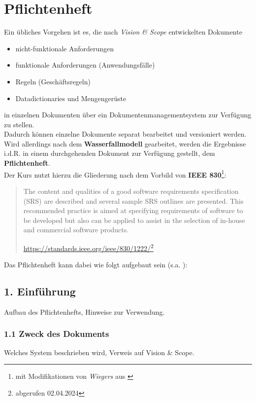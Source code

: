 \section{Pflichtenheft}

\noindent
Ein übliches Vorgehen ist es, die nach \textit{Vision \& Scope} entwickelten Dokumente
\begin{itemize}
    \item nicht-funktionale Anforderungen
    \item funktionale Anforderungen (Anwendungsfälle)
    \item Regeln (Geschäftsregeln)
    \item Datadictionaries und Mengengerüste
\end{itemize}

\noindent
in einzelnen Dokumenten über ein Dokumentenmanagementsystem zur Verfügung zu stellen.\\
Dadurch können einzelne Dokumente separat bearbeitet und versioniert werden.\\

\noindent
Wird allerdings nach dem \textbf{Wasserfallmodell} gearbeitet, werden die Ergebnisse i.d.R. in einem durchgehenden Dokument zur Verfügung gestellt, dem \textbf{Pflichtenheft}.\\

\noindent
Der Kurs nutzt hierzu die Gliederung nach dem Vorbild von \textbf{IEEE 830}\footnote{
mit Modifikationen  von \textit{Wiegers} aus \cite[190 ff.]{WJ13}
}:

\blockquote[{\url{https://standards.ieee.org/ieee/830/1222/}\footnote{abgerufen 02.04.2024}}]{
    The content and qualities of a good software requirements specification (SRS) are described and several sample SRS outlines are presented. This recommended practice is aimed at specifying requirements of software to be developed but also can be applied to assist in the selection of in-house and commercial software products.
}

\noindent
Das Pflichtenheft kann dabei wie folgt aufgebaut sein (s.a. \cite[190 ff.]{WJ13}):

\subsection*{1. Einführung}
Aufbau des Pflichtenhefts, Hinweise zur Verwendung.

\subsubsection*{1.1 Zweck des Dokuments}
Welches System beschrieben wird, Verweis auf Vision \& Scope.


